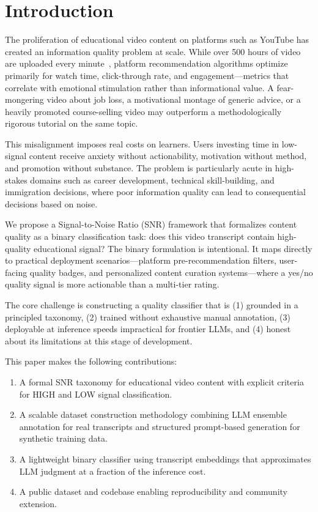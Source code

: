 \documentclass[11pt,a4paper]{article}
\begin{document}
\section{Introduction}

The proliferation of educational video content on platforms such as YouTube has created an
information quality problem at scale. While over 500 hours of video are uploaded every minute~\cite{statista_youtube},
platform recommendation algorithms optimize primarily for watch time, click-through rate, and
engagement---metrics that correlate with emotional stimulation rather than informational value.
A fear-mongering video about job loss, a motivational montage of generic advice, or a heavily
promoted course-selling video may outperform a methodologically rigorous tutorial on the same
topic.

This misalignment imposes real costs on learners. Users investing time in low-signal content
receive anxiety without actionability, motivation without method, and promotion without
substance. The problem is particularly acute in high-stakes domains such as career development,
technical skill-building, and immigration decisions, where poor information quality can lead to
consequential decisions based on noise.

We propose a Signal-to-Noise Ratio (SNR) framework that formalizes content quality as a binary
classification task: does this video transcript contain high-quality educational signal? The
binary formulation is intentional. It maps directly to practical deployment scenarios---platform
pre-recommendation filters, user-facing quality badges, and personalized content curation
systems---where a yes/no quality signal is more actionable than a multi-tier rating.

The core challenge is constructing a quality classifier that is (1) grounded in a principled
taxonomy, (2) trained without exhaustive manual annotation, (3) deployable at inference speeds
impractical for frontier LLMs, and (4) honest about its limitations at this stage of development.

This paper makes the following contributions:
\begin{enumerate}
  \item A formal SNR taxonomy for educational video content with explicit criteria for HIGH and
  LOW signal classification.
  \item A scalable dataset construction methodology combining LLM ensemble annotation for real
  transcripts and structured prompt-based generation for synthetic training data.
  \item A lightweight binary classifier using transcript embeddings that approximates LLM
  judgment at a fraction of the inference cost.
  \item A public dataset and codebase enabling reproducibility and community extension.
\end{enumerate}
\end{document}
